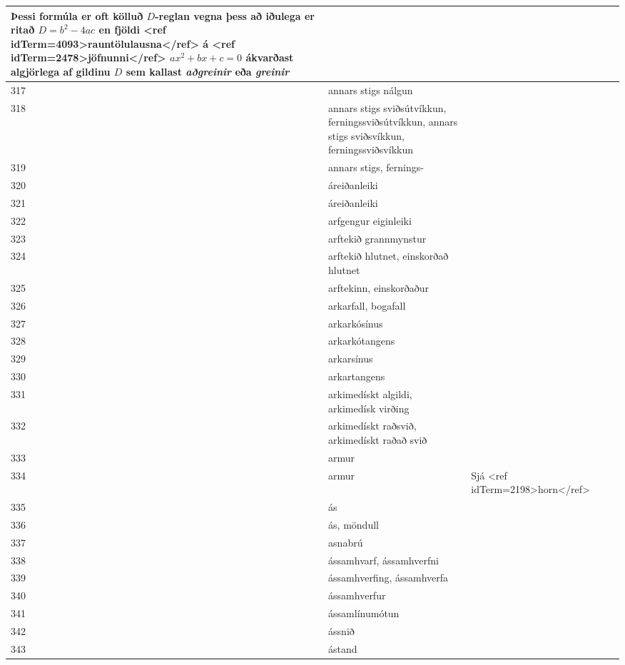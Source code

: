 \begin{longtable}{p{}|p{}|p{}|p{}|p{}}
Þessi formúla er oft kölluð $D$-reglan vegna þess að iðulega er ritað $D=b^2-4ac$ en fjöldi <ref idTerm=4093>rauntölulausna</ref> á <ref idTerm=2478>jöfnunni</ref> $ax^2 + bx + c=0$ ákvarðast algjörlega af gildinu $D$ sem kallast \textit{aðgreinir} eða \textit{greinir} & \\
\hline
317 & annars stigs nálgun &  &  &  \\
\hline
318 & annars stigs sviðsútvíkkun, ferningssviðsútvíkkun, annars stigs sviðsvíkkun, ferningssviðsvíkkun &  &  &  \\
\hline
319 & annars stigs, fernings- &  &  &  \\
\hline
320 & áreiðanleiki &  &  &  \\
\hline
321 & áreiðanleiki &  &  &  \\
\hline
322 & arfgengur eiginleiki &  &  &  \\
\hline
323 & arftekið grannmynstur &  &  &  \\
\hline
324 & arftekið hlutnet, einskorðað hlutnet &  &  &  \\
\hline
325 & arftekinn, einskorðaður &  &  &  \\
\hline
326 & arkarfall, bogafall &  &  &  \\
\hline
327 & arkarkósínus &  &  &  \\
\hline
328 & arkarkótangens &  &  &  \\
\hline
329 & arkarsínus &  &  &  \\
\hline
330 & arkartangens &  &  &  \\
\hline
331 & arkimedískt algildi, arkimedísk virðing &  &  &  \\
\hline
332 & arkimedískt raðsvið, arkimedískt raðað svið &  &  &  \\
\hline
333 & armur &  &  &  \\
\hline
334 & armur & Sjá <ref idTerm=2198>horn</ref> &  &  \\
\hline
335 & ás &  &  &  \\
\hline
336 & ás, möndull &  &  &  \\
\hline
337 & asnabrú &  &  &  \\
\hline
338 & ássamhvarf, ássamhverfni &  &  &  \\
\hline
339 & ássamhverfing, ássamhverfa &  &  &  \\
\hline
340 & ássamhverfur &  &  &  \\
\hline
341 & ássamlínumótun &  &  &  \\
\hline
342 & ássnið &  &  &  \\
\hline
343 & ástand &  &  &  \\

\end{longtable}
